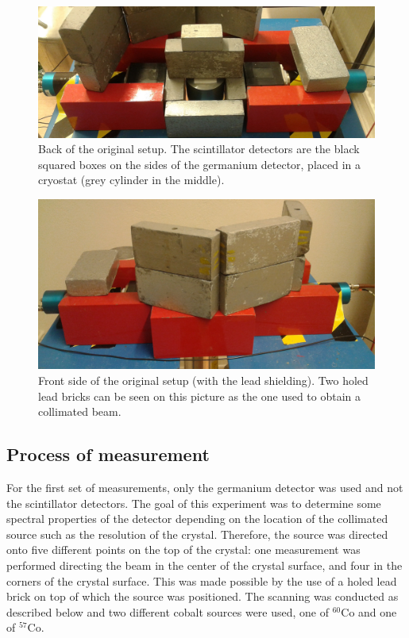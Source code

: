 \documentclass[11pt,a4paper]{article}
\begin{document}
\begin{figure}[!h]
\centering
\includegraphics[scale=0.15]{New_setup_back.jpg}
\caption{Back of the original setup. The scintillator detectors are the black squared boxes on the sides of the germanium detector, placed in a cryostat (grey cylinder in the middle).}
\label{Setup}
\end{figure}

\begin{figure}[!h]
\centering
\includegraphics[scale=0.15]{New_setup_front.jpg}
\caption{Front side of the original setup (with the lead shielding). Two holed lead bricks can be seen on this picture as the one used to obtain a collimated beam.}
\label{Setup_front}
\end{figure}

\subsection{Process of measurement} \label{protocol}

For the first set of measurements, only the germanium detector was used and not the scintillator detectors. The goal of this experiment was to determine some spectral properties of the detector depending on the location of the collimated source such as the resolution of the crystal. Therefore, the source was directed onto five different points on the top of the crystal: one measurement was performed directing the beam in the center of the crystal surface, and four in the corners of the crystal surface. This was made possible by the use of a holed lead brick on top of which the source was positioned. The scanning was conducted as described below and two different cobalt sources were used, one of $^{60}$Co and one of $^{57}$Co.
\end{document}
